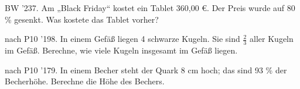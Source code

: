 \documentclass[11pt]{article}
\begin{document}
\pfgruppe{}
\begin{pfaufg}{BW ’23}{7.}{}
Am „Black Friday“ kostet ein Tablet 360,00 €. Der Preis wurde auf 80 \% gesenkt. Was kostete das Tablet vorher?
\end{pfaufg}
\pfgruppe{}
\begin{pfaufg}{nach P10 ’19}{8.}{}
In einem Gefäß liegen 4 schwarze Kugeln. Sie sind $\tfrac{2}{3}$ aller Kugeln im Gefäß. Berechne, wie viele Kugeln insgesamt im Gefäß liegen.
\end{pfaufg}
\pfgruppe{}
\begin{pfaufg}{nach P10 ’17}{9.}{}
In einem Becher steht der Quark 8 cm hoch; das sind 93 \% der Becherhöhe. Berechne die Höhe des Bechers.
\end{pfaufg}
\end{document}
